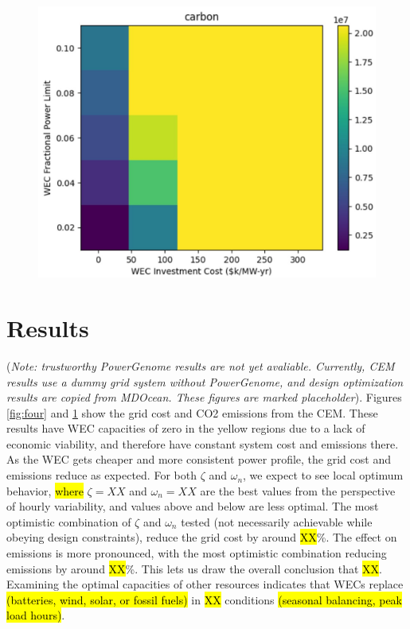 \documentclass[10pt,twoside]{article}
\newif\ifplaceholder
\let\originalincludegraphics\includegraphics
\renewcommand{\includegraphics}[2][]{%
  \ifplaceholder
    \begin{tikzpicture}
      \node[anchor=south west, inner sep=0] (img) at (0,0) {\originalincludegraphics[#1]{#2}};
      \node at ($(img.south east)!0.5!(img.north west)$)
        [fill=white,opacity=0.8,text=red,font=\huge] {Placeholder};
    \end{tikzpicture}
    \vspace{-\baselineskip}
  \else
    \originalincludegraphics[#1]{#2}%
  \fi
  \placeholderfalse %
}
\begin{document}
\begin{figure}[b]
\begin{minipage}[b]{0.32\textwidth}
    \includegraphics[width=\linewidth]{figures/carbon.JPG}
    \label{fig:five}
\end{minipage}
\end{figure}

\section{Results}
(\textit{Note: trustworthy PowerGenome results are not yet avaliable. Currently, CEM results use a dummy grid system without PowerGenome, and design optimization results are copied from MDOcean. These figures are marked placeholder}).
Figures \ref{fig:four} and \ref{fig:five} show the grid cost and CO2 emissions from the CEM.
These results have WEC capacities of zero in the yellow regions due to a lack of economic viability, and therefore have constant system cost and emissions there.
As the WEC gets cheaper and more consistent power profile, the grid cost and emissions reduce as expected.
For both $\zeta$ and $\omega_n$, we expect to see local optimum behavior, \hl{where} $\zeta=XX$ and $\omega_n=XX$ are the best values from the perspective of hourly variability, and values above and below are less optimal.
The most optimistic combination of $\zeta$ and $\omega_n$ tested (not necessarily achievable while obeying design constraints), reduce the grid cost by around \hl{XX}\%.
The effect on emissions is more pronounced, with the most optimistic combination reducing emissions by around \hl{XX}\%.
This lets us draw the overall conclusion that \hl{XX}.
Examining the optimal capacities of other resources indicates that WECs replace \hl{(batteries, wind, solar, or fossil fuels)} in \hl{XX} conditions \hl{(seasonal balancing, peak load hours)}.
\end{document}
